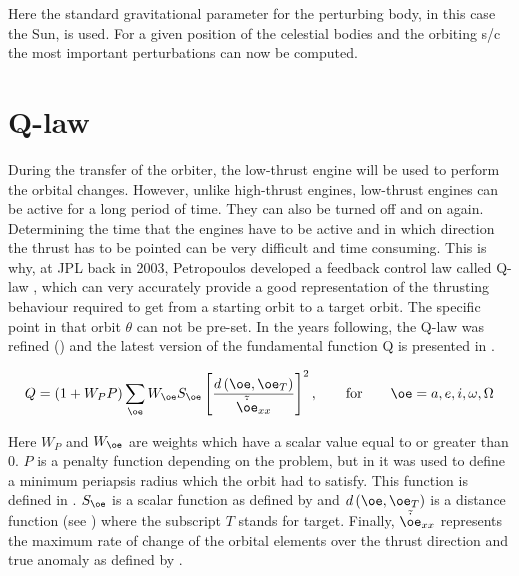 

Here the standard gravitational parameter for the perturbing body, in this case the Sun, is used. For a given position of the celestial bodies and the orbiting \ac{s/c} the most important perturbations can now be computed. 


\section{Q-law}  %
\label{sec:qlawnbody}
During the transfer of the orbiter, the low-thrust engine will be used to perform the orbital changes. However, unlike high-thrust engines, low-thrust engines can be active for a long period of time. They can also be turned off and on again. Determining the time that the engines have to be active and in which direction the thrust has to be pointed can be very difficult and time consuming. This is why, at \ac{JPL} back in 2003, Petropoulos developed a feedback control law called Q-law \cite{petropoulos2003simple}, which can very accurately provide a good representation of the thrusting behaviour required to get from a starting orbit to a target orbit. The specific point in that orbit $\theta$ can not be pre-set. In the years following, the Q-law was refined (\cite{petropoulos2004low,petropoulos2005refinements}) and the latest version of the fundamental function Q is presented in .

\begin{equation} \label{eq:Q}
Q=\left(1+W_{P}P\right)\displaystyle\sum_{\oe}W_{\oe}S_{\oe}\left[\dfrac{d\left(\oe,\oe_{T}\right)}{\tilde{\dot{\oe}}_{xx}}\right]^{2},\qquad  \text{for} \qquad \oe=a,e,i,\omega,\Omega
\end{equation}



Here $W_{P}$ and $W_{\oe}$ are weights which have a scalar value equal to or greater than 0. $P$ is a penalty function depending on the problem, but in \cite{petropoulos2005refinements} it was used to define a minimum periapsis radius which the orbit had to satisfy. This function is defined in . $S_{\oe}$ is a scalar function as defined by  and $d\left(\oe,\oe_{T}\right)$ is a distance function (see ) where the subscript $T$ stands for target. Finally, $\tilde{\dot{\oe}}_{xx}$ represents the maximum rate of change of the orbital elements over the thrust direction and true anomaly as defined by . 

